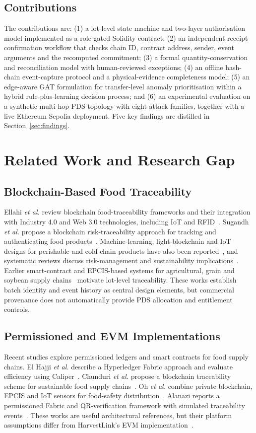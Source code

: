 \documentclass[conference,a4paper]{IEEEtran}
\begin{document}
\subsection{Contributions}
The contributions are: (1) a lot-level state machine and two-layer authorisation model implemented as a role-gated Solidity contract; (2) an independent receipt-confirmation workflow that checks chain ID, contract address, sender, event arguments and the recomputed commitment; (3) a formal quantity-conservation and reconciliation model with human-reviewed exceptions; (4) an offline hash-chain event-capture protocol and a physical-evidence completeness model; (5) an edge-aware GAT formulation for transfer-level anomaly prioritisation within a hybrid rule-plus-learning decision process; and (6) an experimental evaluation on a synthetic multi-hop PDS topology with eight attack families, together with a live Ethereum Sepolia deployment. Five key findings are distilled in Section~\ref{sec:findings}.

\section{Related Work and Research Gap}
\subsection{Blockchain-Based Food Traceability}
Ellahi \textit{et al.} review blockchain food-traceability frameworks and their integration with Industry 4.0 and Web 3.0 technologies, including IoT and RFID~\cite{ellahi2023}. Sugandh \textit{et al.} propose a blockchain risk-traceability approach for tracking and authenticating food products~\cite{sugandh2023}. Machine-learning, light-blockchain and IoT designs for perishable and cold-chain products have also been reported~\cite{feng2024,villegas2025,uyar2025}, and systematic reviews discuss risk-management and sustainability implications~\cite{foodcontrol2026}. Earlier smart-contract and EPCIS-based systems for agricultural, grain and soybean supply chains~\cite{li2021,zhang2020,salah2019,wang2019,lin2019} motivate lot-level traceability. These works establish batch identity and event history as central design elements, but commercial provenance does not automatically provide PDS allocation and entitlement controls.

\subsection{Permissioned and EVM Implementations}
Recent studies explore permissioned ledgers and smart contracts for food supply chains. El Hajji \textit{et al.} describe a Hyperledger Fabric approach and evaluate efficiency using Caliper~\cite{elhajji2024}. Chunduri \textit{et al.} propose a blockchain traceability scheme for sustainable food supply chains~\cite{chunduri2024}. Oh \textit{et al.} combine private blockchain, EPCIS and IoT sensors for food-safety distribution~\cite{oh2025}. Alanazi reports a permissioned Fabric and QR-verification framework with simulated traceability events~\cite{alanazi2026}. These works are useful architectural references, but their platform assumptions differ from HarvestLink's EVM implementation~\cite{wood2014,openzeppelin}.
\end{document}
